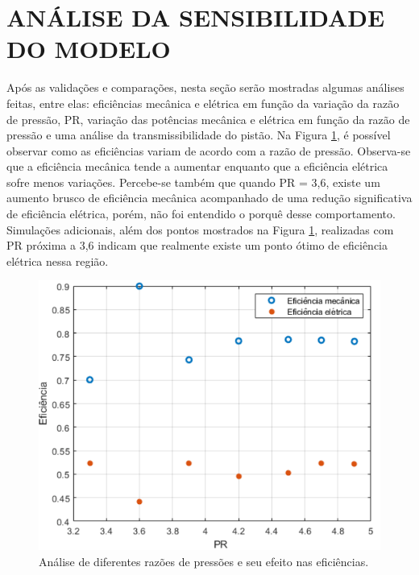 \section{ANÁLISE DA SENSIBILIDADE DO MODELO} 

Após as validações e comparações, nesta seção serão mostradas algumas análises feitas, entre elas: eficiências mecânica e elétrica em função da variação da razão de pressão, PR, variação das potências mecânica e elétrica em função da razão de pressão e uma análise da transmissibilidade do pistão.
Na Figura \ref{fig:comp_PR_efic}, é possível observar como as eficiências variam de acordo com a razão de pressão. Observa-se que a eficiência mecânica tende a aumentar enquanto que a eficiência elétrica sofre menos variações. Percebe-se também que quando PR = 3,6, existe um aumento brusco de eficiência mecânica acompanhado de uma redução significativa de eficiência elétrica, porém, não foi entendido o porquê desse comportamento. Simulações adicionais, além dos pontos mostrados na Figura \ref{fig:comp_PR_efic}, realizadas com PR próxima a 3,6 indicam que realmente existe um ponto ótimo de eficiência elétrica nessa região.  


 \begin{figure}[htb]
	\caption{\label{fig:comp_PR_efic} Análise de diferentes razões de pressões e seu efeito nas eficiências.}
	\begin{center}
		\includegraphics[scale=0.50]{images/efic.png}
	\end{center}
\end{figure}




